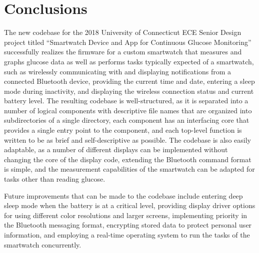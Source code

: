 \chapter{Conclusions}
\label{conclusionchap}

The new codebase for the 2018 University of Connecticut ECE Senior Design project titled ``Smartwatch Device and App for Continuous Glucose Monitoring'' successfully realizes the firmware for a custom smartwatch that measures and graphs glucose data as well as performs tasks typically expected of a smartwatch, such as wirelessly communicating with and displaying notifications from a connected Bluetooth device, providing the current time and date, entering a sleep mode during inactivity, and displaying the wireless connection status and current battery level. The resulting codebase is well-structured, as it is separated into a number of logical components with descriptive file names that are organized into subdirectories of a single directory, each component has an interfacing core that provides a single entry point to the component, and each top-level function is written to be as brief and self-descriptive as possible. The codebase is also easily adaptable, as a number of different displays can be implemented without changing the core of the display code, extending the Bluetooth command format is simple, and the measurement capabilities of the smartwatch can be adapted for tasks other than reading glucose.

Future improvements that can be made to the codebase include entering deep sleep mode when the battery is at a critical level, providing display driver options for using different color resolutions and larger screens, implementing priority in the Bluetooth messaging format, encrypting stored data to protect personal user information, and employing a real-time operating system to run the tasks of the smartwatch concurrently.
